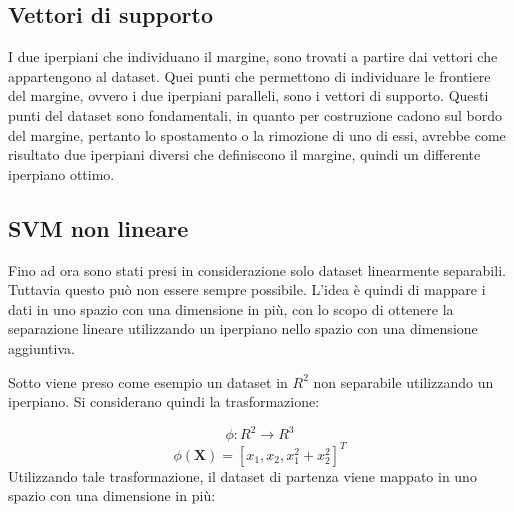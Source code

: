 \documentclass[oneside]{book}
\begin{document}
\subsection{Vettori di supporto}
I due iperpiani che individuano il margine, sono trovati a partire dai vettori che appartengono al dataset. Quei punti che permettono di individuare le frontiere del margine, ovvero i due iperpiani paralleli, sono i vettori di supporto. Questi punti del dataset sono fondamentali, in quanto per costruzione cadono sul bordo del margine, pertanto lo spostamento o la rimozione di uno di essi, avrebbe come risultato due iperpiani diversi che definiscono il margine, quindi un differente iperpiano ottimo.

\subsection{SVM non lineare}
Fino ad ora sono stati presi in considerazione solo dataset linearmente separabili. Tuttavia questo può non essere sempre possibile. L'idea è quindi di mappare i dati in uno spazio con una dimensione in più, con lo scopo di ottenere la separazione lineare utilizzando un iperpiano nello spazio con una dimensione aggiuntiva.

Sotto viene preso come esempio un dataset in $R^2$ non separabile utilizzando un iperpiano. Si considerano quindi la trasformazione:


$$\phi \colon R^2 \to R^3$$
$$\phi(\boldsymbol{X})  = [x_1, x_2, x_1^2 + x_2^2]^T$$ 
Utilizzando tale trasformazione, il dataset di partenza viene mappato in uno spazio con una dimensione in più:
\end{document}
